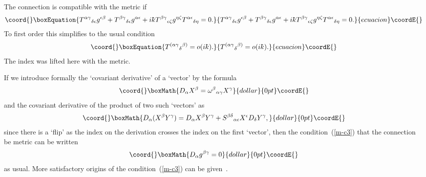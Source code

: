 \documentclass[12pt,a4paper]{article}
\newcounter{eg}
\def\kbar{{\mathchar'26\mkern-9muk}}
\begin{document}
The connection is compatible with the metric if
\begin{equation}\coord{}\boxEquation{
T^{\alpha\gamma}{}_{\delta\epsilon} g^{\epsilon\beta} +
T^{\beta\gamma}{}_{\delta\epsilon} g^{\alpha\epsilon} +
i\kbar T^{\beta\gamma}{}_{\epsilon\zeta} g^{\eta\zeta}
T^{\alpha\epsilon}{}_{\delta\eta} = 0.                          \label{m-c3}
}{
T^{\alpha\gamma}{}_{\delta\epsilon} g^{\epsilon\beta} +
T^{\beta\gamma}{}_{\delta\epsilon} g^{\alpha\epsilon} +
i\kbar T^{\beta\gamma}{}_{\epsilon\zeta} g^{\eta\zeta}
T^{\alpha\epsilon}{}_{\delta\eta} = 0.                          }{ecuacion}\coordE{}\end{equation}
To first order this simplifies to the usual condition
\begin{equation}\coord{}\boxEquation{
T^{(\alpha\gamma}{}_{\delta}{}^{\beta)} = o(i\kbar).            \label{m-c2}
}{
T^{(\alpha\gamma}{}_{\delta}{}^{\beta)} = o(i\kbar).            }{ecuacion}\coordE{}\end{equation}
The index was lifted here with the metric.  

If we introduce formally the `covariant derivative' \coordHE{}
of a `vector' \coordHE{} by the formula
$$\coord{}\boxMath{
D_\alpha X^\beta = \omega^\beta{}_{\alpha\gamma} X^\gamma
}{dollar}{0pt}\coordE{}$$
and the covariant derivative \coordHE{} of the
product of two such `vectors' as
$$\coord{}\boxMath{
D_\alpha (X^\beta Y^\gamma) = D_\alpha X^\beta Y^\gamma + 
S^{\beta\delta}{}_{\alpha\epsilon} X^\epsilon D_\delta Y^\gamma,
}{dollar}{0pt}\coordE{}$$
since there is a `flip' as the index on the derivation crosses the
index on the first `vector', then the condition~(\ref{m-c3}) that the
connection be metric can be written
$$\coord{}\boxMath{
D_\alpha g^{\beta\gamma} = 0
}{dollar}{0pt}\coordE{}$$
as usual. More satisfactory origins of the condition~(\ref{m-c3})
can be given~\cite{DubMadMasMou95}.
\end{document}

